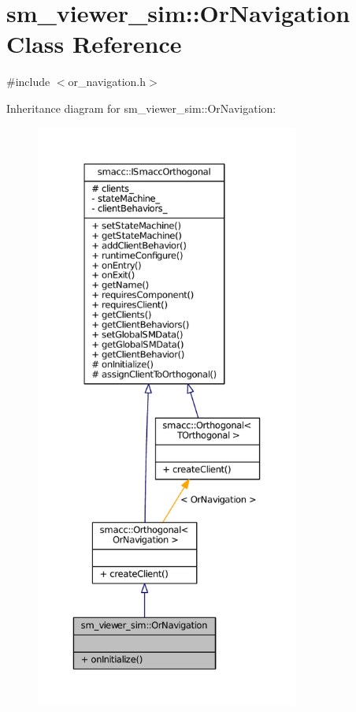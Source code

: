 \hypertarget{classsm__viewer__sim_1_1OrNavigation}{}\section{sm\+\_\+viewer\+\_\+sim\+:\+:Or\+Navigation Class Reference}
\label{classsm__viewer__sim_1_1OrNavigation}


{\ttfamily \#include $<$or\+\_\+navigation.\+h$>$}



Inheritance diagram for sm\+\_\+viewer\+\_\+sim\+:\+:Or\+Navigation\+:
\nopagebreak
\begin{figure}[H]
\begin{center}
\leavevmode
\includegraphics[height=550pt]{classsm__viewer__sim_1_1OrNavigation__inherit__graph}
\end{center}
\end{figure}


